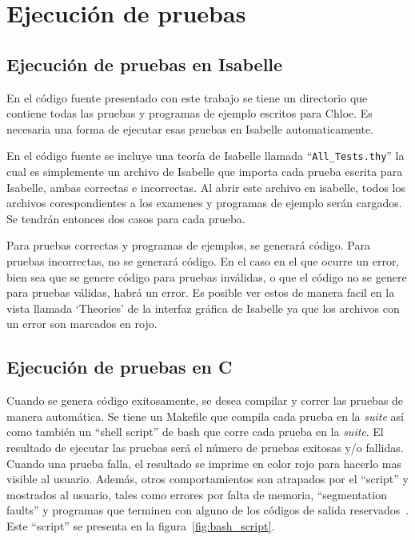 \section{Ejecución de pruebas}

\subsection{Ejecución de pruebas en Isabelle}

En el código fuente presentado con este trabajo se tiene un directorio que contiene todas las pruebas y programas de ejemplo escritos para Chloe.
Es necesaria una forma de ejecutar esas pruebas en Isabelle automaticamente.

En el código fuente se incluye una teoría de Isabelle llamada ``\verb|All_Tests.thy|'' la cual es simplemente un archivo de Isabelle que importa cada prueba escrita para Isabelle, ambas correctas e incorrectas.
Al abrir este archivo en isabelle, todos los archivos corespondientes a los examenes y programas de ejemplo serán cargados.
Se tendrán entonces dos casos para cada prueba.

Para pruebas correctas y programas de ejemplos, se generará código.
Para pruebas incorrectas, no se generará código.
En el caso en el que ocurre un error, bien sea que se genere código para pruebas inválidas, o que el código no se genere para pruebas válidas, habrá un error.
Es posible ver estos de manera facil en la vista llamada `Theories' de la interfaz gráfica de Isabelle ya que los archivos con un error son marcados en rojo.

\subsection{Ejecución de pruebas en C}

Cuando se genera código exitosamente, se desea compilar y correr las pruebas de manera automática.
Se tiene un Makefile que compila cada prueba en la \textit{suite} así como también un ``shell script'' de bash que corre cada prueba en la \textit{suite}.
El resultado de ejecutar las pruebas será el número de pruebas exitosas y/o fallidas.
Cuando una prueba falla, el resultado se imprime en color rojo para hacerlo mas visible al usuario.
Además, otros comportamientos son atrapados por el ``script'' y mostrados al usuario, tales como errores por falta de memoria, ``segmentation faults'' y programas que terminen con alguno de los códigos de salida reservados~\cite{bash-scripting}.
Este ``script'' se presenta en la figura~\ref{fig:bash_script}.

